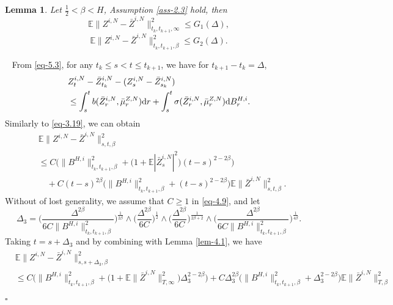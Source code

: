 \documentclass[12pt]{article}
\newtheorem{lemma}[theorem]{Lemma}
\def\d{\text{\rm{d}}}
\def\E{\mathbb E}
\newenvironment{proof}{{\noindent\it Proof.}\ }{\hfill $\square$\par}
\numberwithin{equation}{section}
\begin{document}
\begin{lemma}\label{lem-4.2}
	Let $\frac{1}{2}<\beta<H$, Assumption \ref{ass-2.3} hold, then
	\begin{equation}
		\E\|Z^{i,N}-\bar{Z}^{i,N}\|^2_{t_k,t_{k+1},\infty}\leq G_1(\Delta),
	\end{equation}
	\begin{equation}
		\E\|Z^{i,N}-\bar{Z}^{i,N}\|^2_{t_k,t_{k+1},\beta}\leq G_2(\Delta).
	\end{equation}
\end{lemma}
\begin{proof}
From \eqref{eq-5.3}, for any $t_k\leq s < t \leq t_{k+1}$, we have for $t_{k+1}-t_k=\Delta$,
\begin{equation}
	\begin{aligned}
		&Z_{t}^{i,N}-\bar Z_{t_k}^{i,N}-(Z_{s}^{i,N}-\bar Z_{s_k}^{i,N})\\
		&\leq \int_{s}^{t}b(\bar Z_{r}^{i,N},\bar \mu_{r}^{Z,N})\d r+\int_{s}^{t}\sigma(\bar Z_{r}^{i,N},\bar \mu_{r}^{Z,N})\d B^{H,i}_{r}.
	\end{aligned}
\end{equation}
Similarly to \eqref{eq-3.19},  we can obtain
\begin{equation}\label{eq-4.9}
	\begin{aligned}
		&\E\|Z^{i,N}-\bar{Z}^{i,N}\|^2_{s,t,\beta}\\
		&\leq C\Big(\|B^{H,i}\|^2_{t_k,t_{k+1},\beta}+\big(1+\E|\bar Z^{i,N}_s|^2\big)(t-s)^{2-2\beta}\Big)\\
		&\quad+C(t-s)^{2\beta}\Big(\|B^{H,i}\|^2_{t_k,t_{k+1},\beta}+(t-s)^{2-2\beta}\Big)\E\|\bar Z^{i,N}\|^2_{s,t,\beta}.
	\end{aligned}
\end{equation}	
Without of lost generality, we assume that $C \geq 1$ in \eqref{eq-4.9}, and let
\begin{equation}
	\Delta_3=\Big(\frac{ \Delta^{2\beta}}{6C\|B^{H,i}\|^2_{t_k,t_{k+1},\beta}}\Big)^{\frac{1}{2\beta}}\wedge \Big(\frac{ \Delta^{2\beta}}{6C}\Big)^{\frac{1}{2}}\wedge \Big(\frac{ \Delta^{2\beta}}{6C}\Big)^{\frac{1}{2\beta+2}}\wedge \Big(\frac{ \Delta^{2\beta}}{6C\|B^{H,i}\|^2_{t_k,t_{k+1},\beta}}\Big)^{\frac{1}{4\beta}}.
\end{equation}
Taking $t=s+\Delta_3$ and by combining with Lemma \ref{lem-4.1}, we have
\begin{equation}
	\begin{aligned}
		&\E\|Z^{i,N}-\bar{Z}^{i,N}\|^2_{s,s+\Delta_3,\beta}\\
		&\leq C\Big(\|B^{H,i}\|^2_{t_k,t_{k+1},\beta}+\big(1+\E\|\bar Z^{i,N}\|^2_{T,\infty}\big)\Delta_3^{2-2\beta}\Big)+C\Delta_3^{2\beta}\Big(\|B^{H,i}\|^2_{t_k,t_{k+1},\beta}+\Delta_3^{2-2\beta}\Big)\E\|\bar Z^{i,N}\|^2_{T,\beta}\\

\end{aligned}
\end{equation}
\end{proof}
\end{document}
